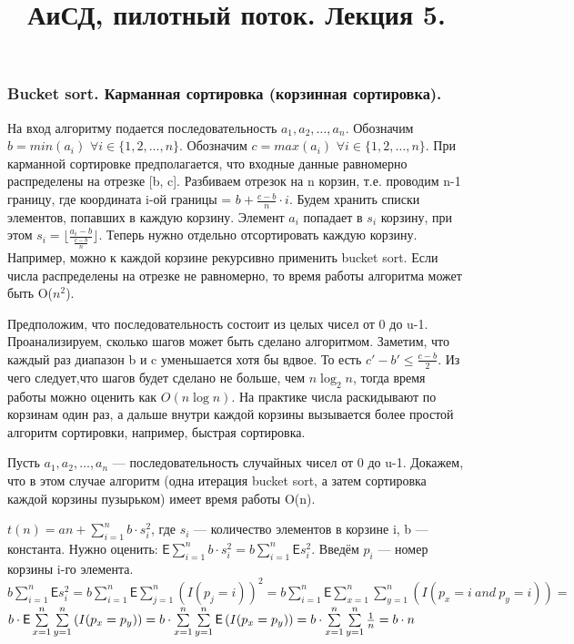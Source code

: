 \documentclass[a4paper, 12pt]{article}
\title{АиСД, пилотный поток. Лекция 5.}
\author{}
\date{}
\begin{document}
\lstset{numbers=left}
    \maketitle
\newcommand{\Expect}{\mathsf{E}}
\subsubsection*{Bucket sort. Карманная сортировка (корзинная сортировка).}
На вход алгоритму подается последовательность $a_1, a_2, \ldots, a_n$. Обозначим $b = min(a_i)$ $\forall i \in \{1, 2,  \ldots , n\}$. Обозначим $c = max(a_i)$ $\forall i \in \{1, 2,  \ldots , n\}$.
При карманной сортировке предполагается, что входные данные равномерно распределены на отрезке [b, c]. Разбиваем отрезок на n корзин, т.е. проводим n-1 границу, где координата i-ой границы = $b+\frac{c-b}{n}\cdot i$.
Будем хранить списки элементов, попавших в каждую корзину. Элемент $a_i$ попадает в $s_i$ корзину, при этом $s_i = \lfloor\frac{a_i-b}{\frac{c-b}{n}}\rfloor$.
Теперь нужно отдельно отсортировать каждую корзину. Например, можно к каждой корзине рекурсивно применить bucket sort. Если числа распределены на отрезке не равномерно, то время работы алгоритма может быть O($n^2$).

Предположим, что последовательность состоит из целых чисел от 0 до u-1. Проанализируем, сколько шагов может быть сделано алгоритмом. Заметим, что каждый раз диапазон b и c уменьшается хотя бы вдвое. То есть $c'-b'\leqslant \frac{c-b}{2}$.
Из чего следует,что шагов будет сделано не больше, чем $n \log_2{n}$, тогда время работы можно оценить как $O(n \log n)$.
На практике числа раскидывают по корзинам один раз, а дальше внутри каждой корзины вызывается более простой алгоритм сортировки, например, быстрая сортировка.

Пусть  $a_1, a_2, \ldots, a_n$ --- последовательность случайных чисел от 0 до u-1. Докажем, что в этом случае алгоритм (одна итерация bucket sort, а затем сортировка каждой корзины пузырьком) имеет время работы O(n).

$t(n) = an + \sum\limits_{i=1}^{n}b\cdot s_i^2$, где $s_i$ --- количество элементов в корзине i, b --- константа.
Нужно оценить:
$\Expect \sum\limits_{i=1}^{n}b\cdot s_i^2 = b\sum\limits_{i=1}^{n}\Expect s_i^2$.
Введём $p_i$ --- номер корзины i-го элемента.
 $b\sum\limits_{i=1}^{n}\Expect s_i^2 = b\sum\limits_{i=1}^{n}\Expect\sum\limits_{j=1}^{n} \left(I(p_j = i)\right)^2 = b\sum\limits_{i=1}^{n}\Expect\sum\limits_{x=1}^{n}\sum\limits_{y=1}^{n} \left(I(p_x = i \ and \ p_y = i)\right) = $
$ b\cdot \Expect\sum\limits_{x=1}^{n}\sum\limits_{y=1}^{n} \left(I(p_x = p_y)\right) = b\cdot \sum\limits_{x=1}^{n}\sum\limits_{y=1}^{n} \Expect\left(I(p_x = p_y)\right) = \\ b\cdot \sum\limits_{x=1}^{n}\sum\limits_{y=1}^{n}\frac{1}{n} = b\cdot n$
\end{document}
